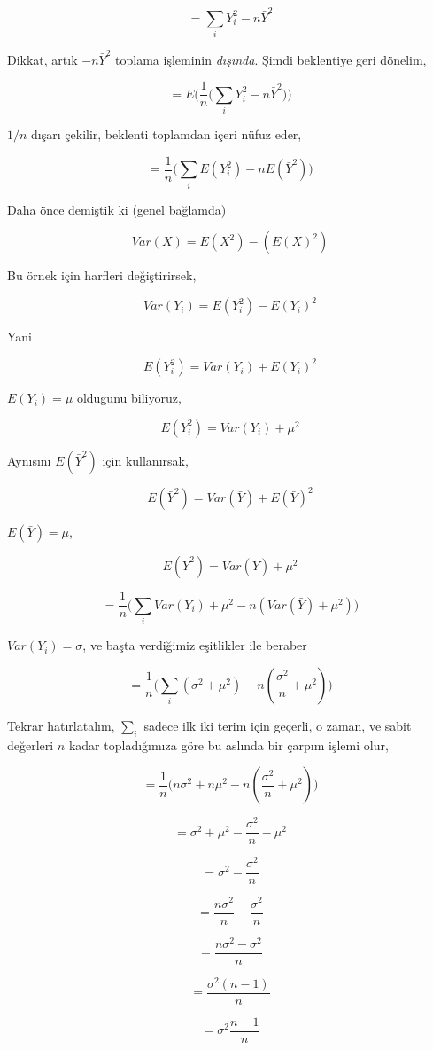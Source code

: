 \documentclass[12pt,fleqn]{article}\usepackage{../../common}
\begin{document}
$$ = \sum_iY_i^2 -n\bar{Y}^2  $$

Dikkat, artık $-n\bar{Y}^2$ toplama işleminin {\em dışında}. Şimdi beklentiye
geri dönelim,

$$ = E \bigg( \frac{1}{n} \bigg( \sum_iY_i^2 -n\bar{Y}^2 \bigg) \bigg) $$

$1/n$ dışarı çekilir, beklenti toplamdan içeri nüfuz eder,

$$ = \frac{1}{n} \bigg(  \sum_i  E(Y_i^2) -n E(\bar{Y}^2) \bigg) $$

Daha önce demiştik ki (genel bağlamda)

$$ Var(X) = E(X^2) - (E(X)^2)$$

Bu örnek için harfleri değiştirirsek,

$$ Var(Y_i) = E(Y_i^2) - E(Y_i)^2$$

Yani

$$ E(Y_i^2) = Var(Y_i) + E(Y_i)^2 $$

$E(Y_i) = \mu$ oldugunu biliyoruz,

$$ E(Y_i^2) = Var(Y_i) + \mu^2 $$

Aynısını $ E(\bar{Y}^2)$ için kullanırsak,

$$  E(\bar{Y}^2) = Var(\bar{Y}) + E(\bar{Y})^2 $$

$E(\bar{Y}) = \mu$, 

$$  E(\bar{Y}^2) = Var(\bar{Y}) + \mu^2 $$

$$
= \frac{1}{n} \bigg(  \sum_i Var(Y_i) + \mu^2   
-n (Var(\bar{Y}) + \mu^2 ) \bigg) 
$$

$Var(Y_i) = \sigma$, ve başta verdiğimiz eşitlikler ile beraber

$$
= \frac{1}{n} \bigg(  \sum_i (\sigma^2 + \mu^2)
-n (\frac{\sigma^2}{n} + \mu^2 ) \bigg) 
$$

Tekrar hatırlatalım, $\sum_i$ sadece ilk iki terim için geçerli, o zaman,
ve sabit değerleri $n$ kadar topladığımıza göre bu aslında bir çarpım
işlemi olur,

$$ 
= \frac{1}{n} \bigg(  n\sigma^2 + n\mu^2   
-n (\frac{\sigma^2}{n} + \mu^2 ) \bigg) 
$$

$$ 
=  \sigma^2 + \mu^2 -\frac{\sigma^2}{n} - \mu^2 
$$

$$ 
=  \sigma^2 -\frac{\sigma^2}{n} 
$$

$$ 
=  \frac{n\sigma^2}{n} -\frac{\sigma^2}{n} 
$$


$$ 
=  \frac{n\sigma^2 - \sigma^2}{n} 
$$

$$ 
=  \frac{\sigma^2(n-1)}{n} 
$$

$$ = \sigma^2 \frac{n-1}{n} $$
\end{document}
